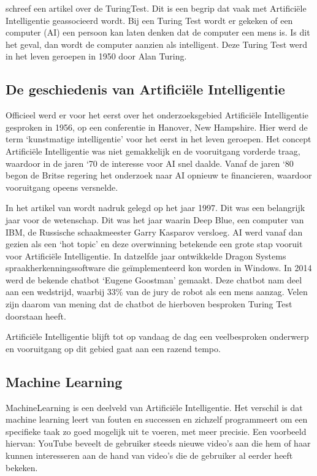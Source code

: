 \textcite{Kraaijvanger2012} schreef een artikel over de \gls{TuringTest}. Dit is een begrip dat vaak met Artificiële Intelligentie geassocieerd wordt. Bij een Turing Test wordt er gekeken of een computer (AI) een persoon kan laten denken dat de computer een mens is. Is dit het geval, dan wordt de computer aanzien als intelligent. Deze Turing Test werd in het leven geroepen in 1950 door Alan Turing. 

\subsection{De geschiedenis van Artificiële Intelligentie}
\label{sec:artificiëleintelligentiegeschiedenis}

Officieel werd er voor het eerst over het onderzoeksgebied Artificiële Intelligentie gesproken in 1956, op een conferentie in Hanover, New Hampshire. Hier werd de term ‘kunstmatige intelligentie’ voor het eerst in het leven geroepen. Het concept Artificiële Intelligentie was niet gemakkelijk en de vooruitgang vorderde traag, waardoor in de jaren ‘70 de interesse voor AI snel daalde. Vanaf de jaren ‘80 begon de Britse regering het onderzoek naar AI opnieuw te financieren, waardoor vooruitgang opeens versnelde. \autocite{Anyoha2017}

In het artikel van \textcite{Anyoha2017} wordt nadruk gelegd op het jaar 1997. Dit was een belangrijk jaar voor de wetenschap. Dit was het jaar waarin Deep Blue, een computer van IBM, de Russische schaakmeester Garry Kasparov versloeg. AI werd vanaf dan gezien als een ‘hot topic’ en deze overwinning betekende een grote stap vooruit voor Artificiële Intelligentie. In datzelfde jaar ontwikkelde Dragon Systems spraakherkenningssoftware die geïmplementeerd kon worden in Windows. 
In 2014 werd de bekende chatbot ‘Eugene Goostman’ gemaakt. Deze chatbot nam deel aan een wedstrijd, waarbij 33\% van de jury de robot als een mens aanzag. Velen zijn daarom van mening dat de chatbot de hierboven besproken Turing Test doorstaan heeft. \autocite{Anyoha2017}
 
Artificiële Intelligentie blijft tot op vandaag de dag een veelbesproken onderwerp en vooruitgang op dit gebied gaat aan een razend tempo. 

\subsection{Machine Learning}
\label{sec:machinelearning}
\gls{MachineLearning} is een deelveld van Artificiële Intelligentie. Het verschil is dat machine learning leert van fouten en successen en zichzelf programmeert om een specifieke taak zo goed mogelijk uit te voeren, met meer precisie. Een voorbeeld hiervan: YouTube beveelt de gebruiker steeds nieuwe video's aan die hem of haar kunnen interesseren aan de hand van video's die de gebruiker al eerder heeft bekeken. \autocite{IBM2021}

